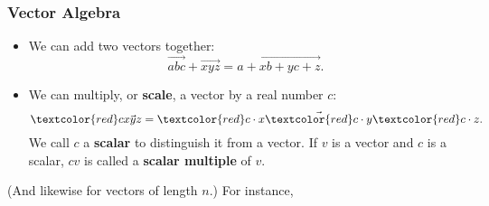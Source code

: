 \begin{frame}
\frametitle{Vector Algebra}

\vskip-3mm
\begin{defn}
  \begin{itemize}
  \item We can add two vectors together:
    \[ \vec{ a b c} + \vec{ x y z} = \vec{ a+x b+y c+z}. \]
    \pause
  \item We can multiply, or \textbf{scale}, a vector by a real number $c$:
    \[ \def\r{\textcolor{red}} \r c\vec{ x y z} 
    = \vec{ \r c\cdot x \r c\cdot y \r c\cdot z}. \]
    \pause
    We call $c$ a \textbf{scalar} to distinguish it from a vector.  If $v$ is a
    vector and $c$ is a scalar, $cv$ is called a \textbf{scalar multiple} of
    $v$.
  \end{itemize}
\end{defn}

\pause
(And likewise for vectors of length $n$.)
\pause
For instance,
\webonlycmd{
\[ \vec{ 1 2 3} + \vec{ 4 5 6} = \vec{ 5 7 9} \sptxt{and} 
-2\vec{ 1 2 3} = \vec{-2 -4 -6}. \]
}

\end{frame}



